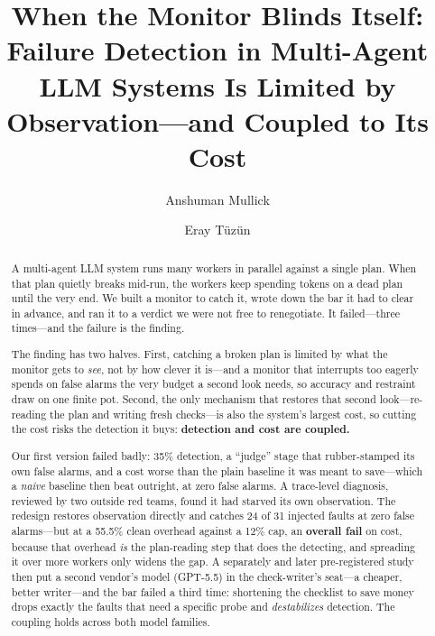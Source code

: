 \documentclass[acmsmall,screen]{acmart}
\begin{document}
\title{When the Monitor Blinds Itself: Failure Detection in Multi-Agent LLM
Systems Is Limited by Observation---and Coupled to Its Cost}

\author{Anshuman Mullick}

\author{Eray T\"uz\"un}

\begin{abstract}
A multi-agent LLM system runs many workers in parallel against a single plan.
When that plan quietly breaks mid-run, the workers keep spending tokens on a dead
plan until the very end. We built a monitor to catch it, wrote down the bar it
had to clear in advance, and ran it to a verdict we were not free to renegotiate.
It failed---three times---and the failure is the finding.

The finding has two halves. First, catching a broken plan is limited by what the
monitor gets to \emph{see}, not by how clever it is---and a monitor that
interrupts too eagerly spends on false alarms the very budget a second look
needs, so accuracy and restraint draw on one finite pot. Second, the only
mechanism that restores that second look---re-reading the plan and writing fresh
checks---is also the system's largest cost, so cutting the cost risks the
detection it buys: \textbf{detection and cost are coupled.}

Our first version failed badly: 35\% detection, a ``judge'' stage that
rubber-stamped its own false alarms, and a cost worse than the plain baseline it
was meant to save---which a \emph{naive} baseline then beat outright, at zero
false alarms. A trace-level diagnosis, reviewed by two outside red teams, found it
had starved its own observation. The redesign restores observation directly and
catches 24 of 31 injected faults at zero false alarms---but at a 55.5\% clean
overhead against a 12\% cap, an \textbf{overall fail} on cost, because that
overhead \emph{is} the plan-reading step that does the detecting, and spreading it
over more workers only widens the gap. A separately and later pre-registered study
then put a second vendor's model (GPT-5.5) in the check-writer's seat---a cheaper,
better writer---and the bar failed a third time: shortening the checklist to save
money drops exactly the faults that need a specific probe and \emph{destabilizes}
detection. The coupling holds across both model families.
\end{abstract}
\end{document}
